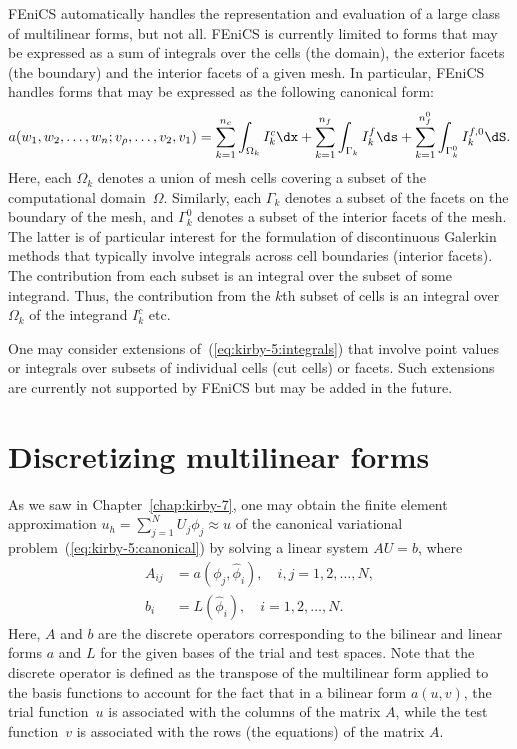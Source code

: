 FEniCS automatically handles the representation and evaluation of a
large class of multilinear forms, but not all. FEniCS is currently
limited to forms that may be expressed as a sum of integrals over the
cells (the domain), the exterior facets (the boundary) and the
interior facets of a given mesh. In particular, FEniCS handles forms
that may be expressed as the following canonical form:
\begin{equation} \label{eq:kirby-5:integrals}
  a(w_1, w_2, \ldots, w_n; v_{\rho}, \ldots, v_2, v_1)
  =
  \sum_{k=1}^{n_c}   \int_{\Omega_k} I^c_k \dx +
  \sum_{k=1}^{n_f}   \int_{\Gamma_k} I^f_k \ds +
  \sum_{k=1}^{n_f^0} \int_{\Gamma_k^0} I^{f,0}_k \dS.
\end{equation}
Here, each $\Omega_k$ denotes a union of mesh cells covering a subset
of the computational domain~$\Omega$. Similarly, each $\Gamma_k$
denotes a subset of the facets on the boundary of the mesh, and
$\Gamma_k^0$ denotes a subset of the interior facets of the
mesh. The latter is of particular interest for the formulation of
discontinuous Galerkin methods that typically involve integrals across
cell boundaries (interior facets). The contribution from each subset
is an integral over the subset of some integrand. Thus, the
contribution from the $k$th subset of cells is an integral over
$\Omega_k$ of the integrand $I^c_k$ etc.

One may consider extensions of~(\ref{eq:kirby-5:integrals}) that
involve point values or integrals over subsets of individual cells
(cut cells) or facets. Such extensions are currently not supported by
FEniCS but may be added in the future.

\section{Discretizing multilinear forms}
\label{sec:kirby-5:discretizing}

As we saw in Chapter~\ref{chap:kirby-7}, one may obtain the finite
element approximation $u_h = \sum_{j=1}^N U_j \phi_j \approx u$ of the
canonical variational problem~(\ref{eq:kirby-5:canonical}) by solving a
linear system $AU=b$, where
\begin{equation}
  \begin{split}
    A_{ij} &= a(\phi_j, \hat{\phi}_i), \quad i,j = 1,2,\ldots,N, \\
    b_i &= L(\hat{\phi}_i), \quad i = 1,2,\ldots,N.
  \end{split}
\end{equation}
Here, $A$ and $b$ are the discrete operators corresponding to the
bilinear and linear forms $a$ and $L$ for the given bases of the trial
and test spaces. Note that the discrete operator is defined as the
transpose of the multilinear form applied to the basis functions to
account for the fact that in a bilinear form $a(u, v)$, the trial
function~$u$ is associated with the columns of the matrix $A$,
while the test function~$v$ is associated with the rows (the
equations) of the matrix $A$.

